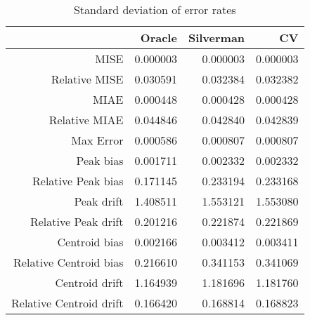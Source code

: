 \begin{table}[ht]
\centering
\begin{tabular}{rrrr}
  \hline
 & Oracle & Silverman & CV \\ 
  \hline
MISE & 0.000003 & 0.000003 & 0.000003 \\ 
  Relative MISE & 0.030591 & 0.032384 & 0.032382 \\ 
  MIAE & 0.000448 & 0.000428 & 0.000428 \\ 
  Relative MIAE & 0.044846 & 0.042840 & 0.042839 \\ 
  Max Error & 0.000586 & 0.000807 & 0.000807 \\ 
  Peak bias & 0.001711 & 0.002332 & 0.002332 \\ 
  Relative Peak bias & 0.171145 & 0.233194 & 0.233168 \\ 
  Peak drift & 1.408511 & 1.553121 & 1.553080 \\ 
  Relative Peak drift & 0.201216 & 0.221874 & 0.221869 \\ 
  Centroid bias & 0.002166 & 0.003412 & 0.003411 \\ 
  Relative Centroid bias & 0.216610 & 0.341153 & 0.341069 \\ 
  Centroid drift & 1.164939 & 1.181696 & 1.181760 \\ 
  Relative Centroid drift & 0.166420 & 0.168814 & 0.168823 \\ 
   \hline
\end{tabular}
\caption{Standard deviation of error rates} 
\label{tbl:stddev_error_rates}
\end{table}
